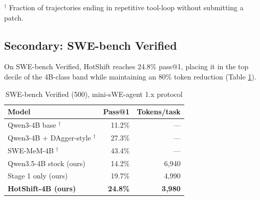 \documentclass[conference]{IEEEtran}
\begin{document}
\begin{table}[htbp]
\caption{DeepSWE-250 Results}
\centering
{}
\label{tab:main}
\end{table}
$^\dagger$ Fraction of trajectories ending in repetitive tool-loop without submitting a patch.

\subsection{Secondary: SWE-bench Verified}
On SWE-bench Verified, HotShift reaches 24.8\% pass@1, placing it in the top decile of the 4B-class band while maintaining an 80\% token reduction (Table \ref{tab:swebench}).

\begin{table}[htbp]
\caption{SWE-bench Verified (500), mini-sWE-agent 1.x protocol}
\centering
\begin{tabular}{@{}lrr@{}}
\toprule
\textbf{Model} & \textbf{Pass@1} & \textbf{Tokens/task} \\
\midrule
Qwen3-4B base $^\dagger$ \cite{swebench4b} & 11.2\% & --- \\
Qwen3-4B + DAgger-style $^\dagger$ \cite{swebench4b} & 27.3\% & --- \\
SWE-MeM-4B $^\dagger$ \cite{swemem} & 43.4\% & --- \\
\midrule
Qwen3.5-4B stock (ours) & 14.2\% & 6,940 \\
Stage 1 only (ours) & 19.7\% & 4,990 \\
\textbf{HotShift-4B (ours)} & \textbf{24.8\%} & \textbf{3,980} \\
\bottomrule
\end{tabular}
\label{tab:swebench}
\end{table}
\end{document}
